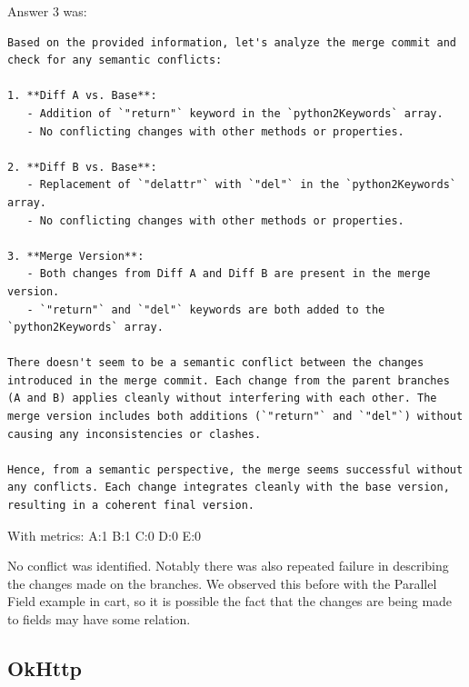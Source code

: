Answer 3 was:
\begin{lstlisting}
Based on the provided information, let's analyze the merge commit and check for any semantic conflicts:

1. **Diff A vs. Base**:
   - Addition of `"return"` keyword in the `python2Keywords` array.
   - No conflicting changes with other methods or properties.

2. **Diff B vs. Base**:
   - Replacement of `"delattr"` with `"del"` in the `python2Keywords` array.
   - No conflicting changes with other methods or properties.

3. **Merge Version**:
   - Both changes from Diff A and Diff B are present in the merge version.
   - `"return"` and `"del"` keywords are both added to the `python2Keywords` array.

There doesn't seem to be a semantic conflict between the changes introduced in the merge commit. Each change from the parent branches (A and B) applies cleanly without interfering with each other. The merge version includes both additions (`"return"` and `"del"`) without causing any inconsistencies or clashes.

Hence, from a semantic perspective, the merge seems successful without any conflicts. Each change integrates cleanly with the base version, resulting in a coherent final version.
\end{lstlisting}

With metrics:
A:1
B:1
C:0
D:0
E:0

No conflict was identified. Notably there was also repeated failure in describing the changes made on the branches. We observed this before with the Parallel Field example in cart, so it is possible the fact that the changes are being made to fields may have some relation.

\subsection{OkHttp}

